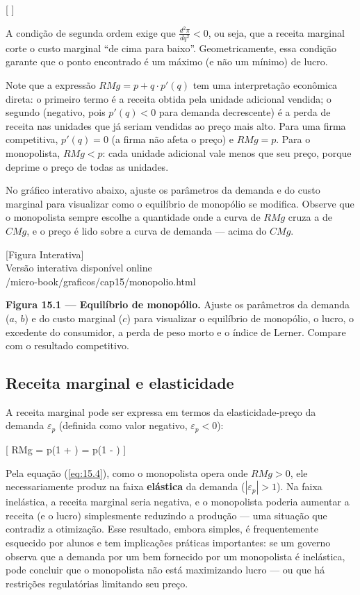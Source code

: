 \documentclass[11pt,twoside,openright]{book}
\newcommand{\figurePlaceholder}[1]{%
  \begin{center}
    \begin{tcolorbox}[
      width=0.85\textwidth,
      colback=graybg,
      colframe=gray,
      boxrule=0.5pt,
      arc=2pt,
      halign=center,
      valign=center,
      height=5cm
    ]
      \centering
      \vfill
      {\sffamily\color{gray}\large [Figura Interativa]}\\[6pt]
      {\sffamily\small\color{gray} Versão interativa disponível online}\\[4pt]
      {\ttfamily\tiny\color{gray} #1}
      \vfill
    \end{tcolorbox}
  \end{center}
}
\begin{document}
{[}  \label{eq:15.3}  {]}

A condição de segunda ordem exige que \(\frac{d^2\pi}{dq^2} < 0\), ou
seja, que a receita marginal corte o custo marginal ``de cima para
baixo''. Geometricamente, essa condição garante que o ponto encontrado é
um máximo (e não um mínimo) de lucro.

Note que a expressão \(RMg = p + q \cdot p'(q)\) tem uma interpretação
econômica direta: o primeiro termo é a receita obtida pela unidade
adicional vendida; o segundo (negativo, pois \(p'(q) < 0\) para demanda
decrescente) é a perda de receita nas unidades que já seriam vendidas ao
preço mais alto. Para uma firma competitiva, \(p'(q) = 0\) (a firma não
afeta o preço) e \(RMg = p\). Para o monopolista, \(RMg < p\): cada
unidade adicional vale menos que seu preço, porque deprime o preço de
todas as unidades.

No gráfico interativo abaixo, ajuste os parâmetros da demanda e do custo
marginal para visualizar como o equilíbrio de monopólio se modifica.
Observe que o monopolista sempre escolhe a quantidade onde a curva de
\(RMg\) cruza a de \(CMg\), e o preço é lido sobre a curva de demanda
--- acima do \(CMg\).

\figurePlaceholder{/micro-book/graficos/cap15/monopolio.html}

\textbf{Figura 15.1 --- Equilíbrio de monopólio.} Ajuste os parâmetros
da demanda (\(a\), \(b\)) e do custo marginal (\(c\)) para visualizar o
equilíbrio de monopólio, o lucro, o excedente do consumidor, a perda de
peso morto e o índice de Lerner. Compare com o resultado competitivo.

\subsection{Receita marginal e
elasticidade}\label{receita-marginal-e-elasticidade}

A receita marginal pode ser expressa em termos da elasticidade-preço da
demanda \(\varepsilon_{p}\) (definida como valor negativo,
\(\varepsilon_p < 0\)):

{[} RMg = p\left(1 + \right) = p\left(1 -
\right) \label{eq:15.4}  {]}

Pela equação (\ref{eq:15.4}), como o monopolista opera onde \(RMg > 0\),
ele necessariamente produz na faixa \textbf{elástica} da demanda
(\(|\varepsilon_p| > 1\)). Na faixa inelástica, a receita marginal seria
negativa, e o monopolista poderia aumentar a receita (e o lucro)
simplesmente reduzindo a produção --- uma situação que contradiz a
otimização. Esse resultado, embora simples, é frequentemente esquecido
por alunos e tem implicações práticas importantes: se um governo observa
que a demanda por um bem fornecido por um monopolista é inelástica, pode
concluir que o monopolista não está maximizando lucro --- ou que há
restrições regulatórias limitando seu preço.
\end{document}

